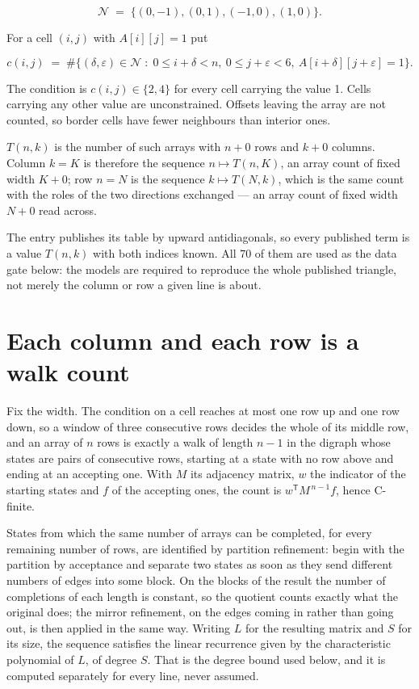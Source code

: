 \documentclass[11pt]{article}
\theoremstyle{definition}
\begin{document}
\[\mathcal{N} \;=\; \{(0,-1), (0,1), (-1,0), (1,0)\}.\]

For a cell $(i,j)$ with $A[i][j] = 1$ put

\[c(i,j) \;=\; \#\bigl\{(\delta,\varepsilon)\in\mathcal{N} \;:\; 0\le i+\delta<n,\ 0\le j+\varepsilon<6,\ A[i+\delta][j+\varepsilon] = 1\bigr\}.\]

The condition is $c(i,j) \in \{2, 4\}$ for every cell carrying the value 1. Cells carrying any other value are unconstrained. Offsets leaving the array are not counted, so border cells have fewer neighbours than interior ones.

$T(n,k)$ is the number of such arrays with $n + 0$ rows and $k + 0$ columns. Column $k = K$ is therefore the sequence $n \mapsto T(n,K)$, an array count of fixed width $K + 0$; row $n = N$ is the sequence $k \mapsto T(N,k)$, which is the same count with the roles of the two directions exchanged --- an array count of fixed width $N + 0$ read across.

The entry publishes its table by upward antidiagonals, so every published term is a value $T(n,k)$ with both indices known. All 70 of them are used as the data gate below: the models are required to reproduce the whole published triangle, not merely the column or row a given line is about.

\section{Each column and each row is a walk count}

Fix the width. The condition on a cell reaches at most one row up and one row down, so a window of three consecutive rows decides the whole of its middle row, and an array of $n$ rows is exactly a walk of length $n-1$ in the digraph whose states are pairs of consecutive rows, starting at a state with no row above and ending at an accepting one. With $M$ its adjacency matrix, $w$ the indicator of the starting states and $f$ of the accepting ones, the count is $w^{\mathsf T}M^{\,n-1}f$, hence C-finite.

States from which the same number of arrays can be completed, for every remaining number of rows, are identified by partition refinement: begin with the partition by acceptance and separate two states as soon as they send different numbers of edges into some block. On the blocks of the result the number of completions of each length is constant, so the quotient counts exactly what the original does; the mirror refinement, on the edges coming in rather than going out, is then applied in the same way. Writing $L$ for the resulting matrix and $S$ for its size, the sequence satisfies the linear recurrence given by the characteristic polynomial of $L$, of degree $S$. That is the degree bound used below, and it is computed separately for every line, never assumed.
\end{document}
